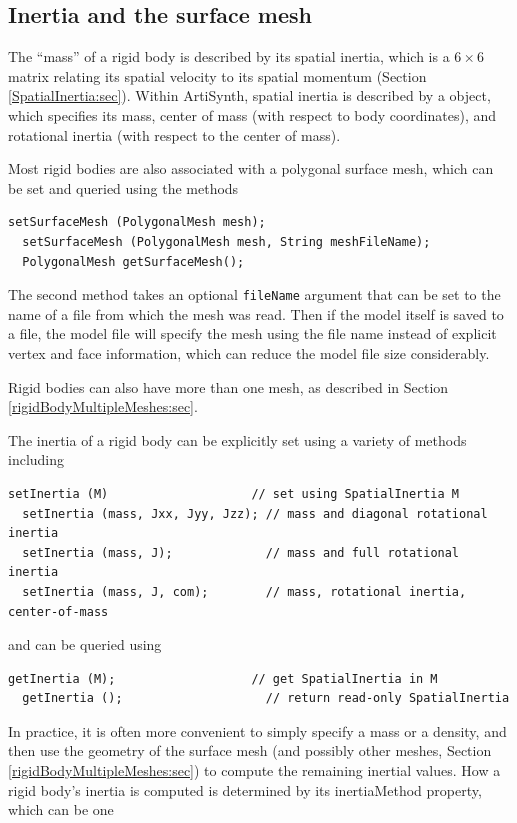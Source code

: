 \subsection{Inertia and the surface mesh}
\label{rigidBodyInertia:sec}

The ``mass'' of a rigid body is described by its spatial inertia,
which is a $6 \times 6$ matrix relating its spatial velocity to its
spatial momentum (Section \ref{SpatialInertia:sec}).  Within
ArtiSynth, spatial inertia is described by a
 object, which
specifies its mass, center of mass (with respect to body coordinates),
and rotational inertia (with respect to the center of mass).

Most rigid bodies are also associated with a polygonal surface mesh,
which can be set and queried using the methods
\begin{lstlisting}[]
  setSurfaceMesh (PolygonalMesh mesh);
  setSurfaceMesh (PolygonalMesh mesh, String meshFileName);
  PolygonalMesh getSurfaceMesh();
\end{lstlisting}
%
The second method takes an optional {\tt fileName} argument that can
be set to the name of a file from which the mesh was read. Then if the
model itself is saved to a file, the model file will specify the mesh
using the file name instead of explicit vertex and face information,
which can reduce the model file size considerably.

Rigid bodies can also have more than one mesh, as described
in Section \ref{rigidBodyMultipleMeshes:sec}.

The inertia of a rigid body can be explicitly set using a variety
of methods including
\begin{lstlisting}[]
  setInertia (M)                    // set using SpatialInertia M
  setInertia (mass, Jxx, Jyy, Jzz); // mass and diagonal rotational inertia
  setInertia (mass, J);             // mass and full rotational inertia
  setInertia (mass, J, com);        // mass, rotational inertia, center-of-mass
\end{lstlisting}
%
and can be queried using 
\begin{lstlisting}[]
  getInertia (M);                   // get SpatialInertia in M
  getInertia ();                    // return read-only SpatialInertia
\end{lstlisting}
%

In practice, it is often more convenient to simply specify a mass or a
density, and then use the geometry of the surface mesh (and possibly
other meshes, Section \ref{rigidBodyMultipleMeshes:sec}) to compute
the remaining inertial values. How a rigid body's inertia is computed
is determined by its {\sf inertiaMethod} property, which can be one

